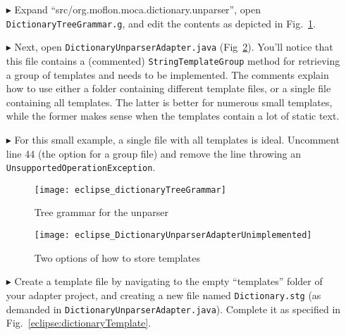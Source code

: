 \begin{itemize}

\item[$\blacktriangleright$] Expand ``src/org.moflon.moca.dictionary.unparser'', open \texttt{Dict\-ion\-ary\-Tree\-Gram\-mar.g}, and edit the contents as
depicted in Fig.~\ref{eclipse:treeGrammar}. 

\vspace{0.5cm}

\item[$\blacktriangleright$] Next, open \texttt{Dict\-ion\-ary\-Un\-pars\-er\-Ad\-ap\-ter.java} (Fig~\ref{eclipse:unparserCommented}). You'll notice that this
file contains a (commented) \texttt{StringTemplateGroup} method for retrieving a group of templates and needs to be implemented. The comments explain how to
use either a folder containing different template files, or a single file containing all templates. The latter is better for numerous small templates, while the
former makes sense when the templates contain a lot of static text.

\vspace{0.5cm}

\item[$\blacktriangleright$] For this small example, a single file with all templates is ideal. Uncomment line 44 (the option for a group file) and remove
the line throwing an \texttt{Un\-sup\-port\-ed\-Op\-er\-at\-ion\-Ex\-cep\-tion}.

\newpage 

\vspace*{2cm}

\begin{figure}[htpb]
\begin{center}
  \texttt{[image: eclipse\_dictionaryTreeGrammar]}
  \caption{Tree grammar for the unparser}
  \label{eclipse:treeGrammar}
\end{center}
\end{figure}

\vspace{1cm}

\begin{figure}[htpb]
\hspace{-1cm}
  \texttt{[image: eclipse\_DictionaryUnparserAdapterUnimplemented]}
  \caption{Two options of how to store templates}
  \label{eclipse:unparserCommented}
\end{figure}

\newpage


\item[$\blacktriangleright$] Create a template file by navigating to the empty ``templates'' folder of your adapter project, and creating a new file
named \texttt{Dictionary.stg} (as demanded in \texttt{Dict\-ion\-ary\-Un\-pars\-er\-Ad\-ap\-ter.java}). Complete it as specified in
Fig.~\ref{eclipse:dictionaryTemplate}.


\end{itemize}
